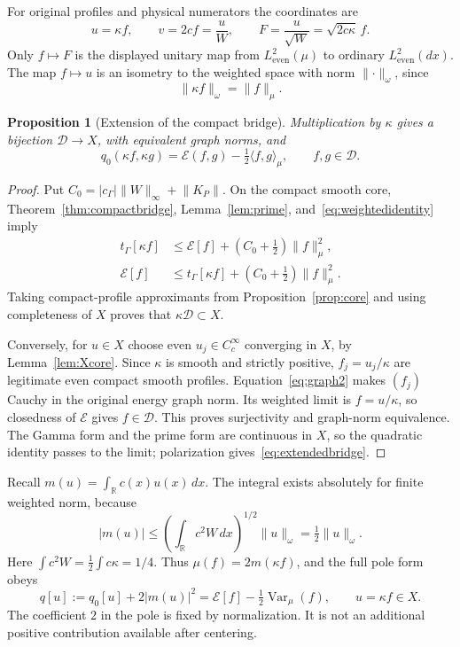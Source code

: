 \documentclass[11pt,a4paper]{article}
\numberwithin{equation}{section}
\newtheorem{proposition}[theorem]{Proposition}
\theoremstyle{remark}
\newcommand{\R}{\mathbb R}
\newcommand{\E}{\mathcal E}
\newcommand{\D}{\mathcal D}
\newcommand{\He}{L^2_{\mathrm{even}}(\mu)}
\newcommand{\Le}{L^2_{\mathrm{even}}(dx)}
\newcommand{\tg}{t_{\Gamma}}
\newcommand{\cg}{c_{\Gamma}}
\newcommand{\Var}{\operatorname{Var}}
\newcommand{\ip}[2]{\langle #1,#2\rangle}
\newcommand{\norm}[1]{\lVert #1\rVert}
\begin{document}
For original profiles and physical numerators the coordinates are
\begin{equation}\label{eq:coordinates}
 u=\kappa f,\qquad v=2cf=\frac uW,\qquad
 F=\frac u{\sqrt W}=\sqrt{2c\kappa}\,f.
\end{equation}
Only $f\mapsto F$ is the displayed unitary map from $\He$ to ordinary $\Le$. The map $f\mapsto u$ is an isometry to the weighted space with norm $\norm{\cdot}_\omega$, since
\begin{equation}\label{eq:weightedidentity}
 \norm{\kappa f}_\omega=\norm{f}_\mu.
\end{equation}

\begin{proposition}[Extension of the compact bridge]\label{prop:domain}
Multiplication by $\kappa$ gives a bijection $\D\to X$, with equivalent graph norms, and
\begin{equation}\label{eq:extendedbridge}
 q_0(\kappa f,\kappa g)=\E(f,g)-\tfrac12\ip{f}{g}_\mu,
 \qquad f,g\in\D.
\end{equation}
\end{proposition}
\begin{proof}
Put $C_0=|\cg|\norm{W}_\infty+\norm{K_P}$. On the compact smooth core, Theorem~\ref{thm:compactbridge}, Lemma~\ref{lem:prime}, and~\eqref{eq:weightedidentity} imply
\begin{align}
 \tg[\kappa f]&\le\E[f]+(C_0+\tfrac12)\norm{f}_\mu^2,\label{eq:graph1}\\
 \E[f]&\le\tg[\kappa f]+(C_0+\tfrac12)\norm{f}_\mu^2.\label{eq:graph2}
\end{align}
Taking compact-profile approximants from Proposition~\ref{prop:core} and using completeness of $X$ proves that $\kappa\D\subset X$.

Conversely, for $u\in X$ choose even $u_j\in C_c^\infty$ converging in $X$, by Lemma~\ref{lem:Xcore}. Since $\kappa$ is smooth and strictly positive, $f_j=u_j/\kappa$ are legitimate even compact smooth profiles. Equation~\eqref{eq:graph2} makes $(f_j)$ Cauchy in the original energy graph norm. Its weighted limit is $f=u/\kappa$, so closedness of $\E$ gives $f\in\D$. This proves surjectivity and graph-norm equivalence. The Gamma form and the prime form are continuous in $X$, so the quadratic identity passes to the limit; polarization gives~\eqref{eq:extendedbridge}.
\end{proof}

Recall $m(u)=\int_\R c(x)u(x)\,dx$. The integral exists absolutely for finite weighted norm, because
\begin{equation}\label{eq:meanbound}
 |m(u)|\le\left(\int_\R c^2W\,dx\right)^{1/2}\norm{u}_\omega
       =\tfrac12\norm{u}_\omega.
\end{equation}
Here $\int c^2W=\tfrac12\int c\kappa=1/4$. Thus $\mu(f)=2m(\kappa f)$, and the full pole form obeys
\begin{equation}\label{eq:polebridge}
 q[u]:=q_0[u]+2|m(u)|^2
       =\E[f]-\tfrac12\Var_\mu(f),\qquad u=\kappa f\in X.
\end{equation}
The coefficient $2$ in the pole is fixed by normalization. It is not an additional positive contribution available after centering.
\end{document}
